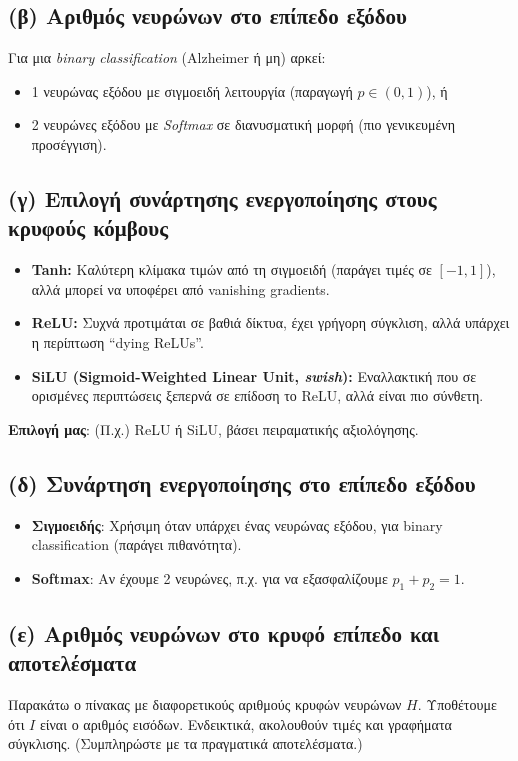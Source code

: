 \documentclass[a4paper,11pt]{article}
\begin{document}
\subsection{(β) Αριθμός νευρώνων στο επίπεδο εξόδου}
Για μια \emph{binary classification} (Alzheimer ή μη) αρκεί:
\begin{itemize}
    \item 1 νευρώνας εξόδου με σιγμοειδή λειτουργία (παραγωγή $p \in (0,1)$), ή
    \item 2 νευρώνες εξόδου με \emph{Softmax} σε διανυσματική μορφή (πιο γενικευμένη προσέγγιση).
\end{itemize}

\subsection{(γ) Επιλογή συνάρτησης ενεργοποίησης στους κρυφούς κόμβους}
\begin{itemize}
    \item \textbf{Tanh:} Καλύτερη κλίμακα τιμών από τη σιγμοειδή (παράγει τιμές σε $[-1, 1]$), αλλά μπορεί να υποφέρει από vanishing gradients.
    \item \textbf{ReLU:} Συχνά προτιμάται σε βαθιά δίκτυα, έχει γρήγορη σύγκλιση, αλλά υπάρχει η περίπτωση “dying ReLUs”.
    \item \textbf{SiLU (Sigmoid-Weighted Linear Unit, \emph{swish}):} Εναλλακτική που σε ορισμένες περιπτώσεις ξεπερνά σε επίδοση το ReLU, αλλά είναι πιο σύνθετη.
\end{itemize}
\noindent
\textbf{Επιλογή μας}: (Π.χ.) ReLU ή SiLU, βάσει πειραματικής αξιολόγησης.

\subsection{(δ) Συνάρτηση ενεργοποίησης στο επίπεδο εξόδου}
\begin{itemize}
    \item \textbf{Σιγμοειδής}: Χρήσιμη όταν υπάρχει ένας νευρώνας εξόδου, για binary classification (παράγει πιθανότητα).
    \item \textbf{Softmax}: Αν έχουμε 2 νευρώνες, π.χ. για να εξασφαλίζουμε $p_1 + p_2 = 1$.
\end{itemize}

\subsection{(ε) Αριθμός νευρώνων στο κρυφό επίπεδο και αποτελέσματα}
Παρακάτω ο πίνακας με διαφορετικούς αριθμούς κρυφών νευρώνων $H$. Υποθέτουμε ότι $I$ είναι ο αριθμός εισόδων. Ενδεικτικά, ακολουθούν τιμές και γραφήματα σύγκλισης. (Συμπληρώστε με τα πραγματικά αποτελέσματα.)
\end{document}
